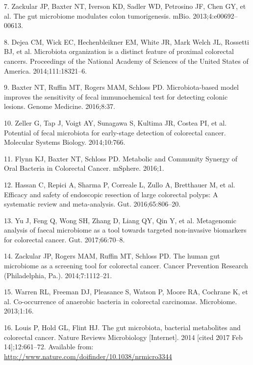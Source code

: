 \documentclass[12pt,]{article}
\begin{document}
\hypertarget{ref-zackular_gut_2013}{}
7. Zackular JP, Baxter NT, Iverson KD, Sadler WD, Petrosino JF, Chen GY,
et al. The gut microbiome modulates colon tumorigenesis. mBio.
2013;4:e00692--00613.

\hypertarget{ref-dejea_microbiota_2014}{}
8. Dejea CM, Wick EC, Hechenbleikner EM, White JR, Mark Welch JL,
Rossetti BJ, et al. Microbiota organization is a distinct feature of
proximal colorectal cancers. Proceedings of the National Academy of
Sciences of the United States of America. 2014;111:18321--6.

\hypertarget{ref-baxter_microbiota-based_2016}{}
9. Baxter NT, Ruffin MT, Rogers MAM, Schloss PD. Microbiota-based model
improves the sensitivity of fecal immunochemical test for detecting
colonic lesions. Genome Medicine. 2016;8:37.

\hypertarget{ref-zeller_potential_2014}{}
10. Zeller G, Tap J, Voigt AY, Sunagawa S, Kultima JR, Costea PI, et al.
Potential of fecal microbiota for early-stage detection of colorectal
cancer. Molecular Systems Biology. 2014;10:766.

\hypertarget{ref-flynn_metabolic_2016}{}
11. Flynn KJ, Baxter NT, Schloss PD. Metabolic and Community Synergy of
Oral Bacteria in Colorectal Cancer. mSphere. 2016;1.

\hypertarget{ref-hassan_efficacy_2016}{}
12. Hassan C, Repici A, Sharma P, Correale L, Zullo A, Bretthauer M, et
al. Efficacy and safety of endoscopic resection of large colorectal
polyps: A systematic review and meta-analysis. Gut. 2016;65:806--20.

\hypertarget{ref-yu_metagenomic_2017}{}
13. Yu J, Feng Q, Wong SH, Zhang D, Liang QY, Qin Y, et al. Metagenomic
analysis of faecal microbiome as a tool towards targeted non-invasive
biomarkers for colorectal cancer. Gut. 2017;66:70--8.

\hypertarget{ref-zackular_human_2014}{}
14. Zackular JP, Rogers MAM, Ruffin MT, Schloss PD. The human gut
microbiome as a screening tool for colorectal cancer. Cancer Prevention
Research (Philadelphia, Pa.). 2014;7:1112--21.

\hypertarget{ref-warren_co-occurrence_2013}{}
15. Warren RL, Freeman DJ, Pleasance S, Watson P, Moore RA, Cochrane K,
et al. Co-occurrence of anaerobic bacteria in colorectal carcinomas.
Microbiome. 2013;1:16.

\hypertarget{ref-louis_gut_2014}{}
16. Louis P, Hold GL, Flint HJ. The gut microbiota, bacterial
metabolites and colorectal cancer. Nature Reviews Microbiology
{[}Internet{]}. 2014 {[}cited 2017 Feb 14{]};12:661--72. Available from:
\url{http://www.nature.com/doifinder/10.1038/nrmicro3344}
\end{document}
